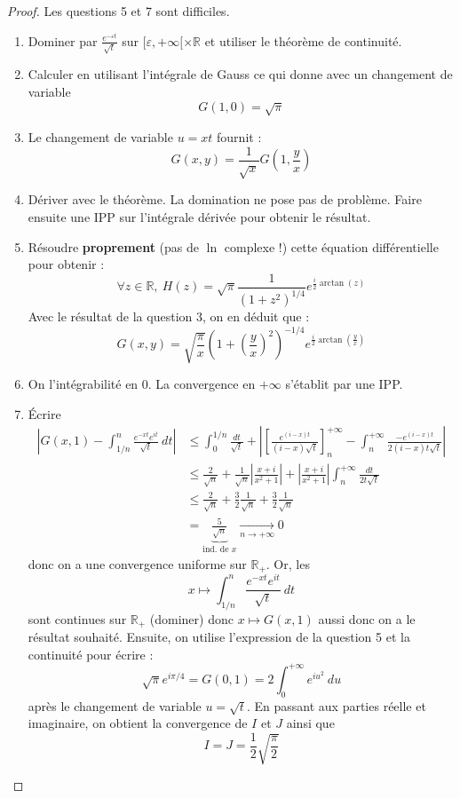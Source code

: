 \documentclass[french,a4paper]{article}
\newcommand{\R}{\mathbb{R}}
\theoremstyle{plain}
\theoremstyle{definition}
\theoremstyle{remark}
\begin{document}
\begin{proof}
	Les questions 5 et 7 sont difficiles.
	\begin{enumerate}
		\item  Dominer par $\displaystyle\frac{e^{-\varepsilon t}}{\sqrt{t}}$ sur $[\varepsilon,+\infty[\times\R$ et utiliser le théorème de continuité.
		\item Calculer en utilisant l'intégrale de Gauss ce qui donne avec un changement de variable $$G(1,0)=\sqrt{\pi}$$
		\item Le changement de variable $u=xt$ fournit : $$G(x,y)=\frac{1}{\sqrt{x}}G\left(1,\frac{y}{x}\right)$$
		\item Dériver avec le théorème. La domination ne pose pas de problème. Faire ensuite une IPP sur l'intégrale dérivée pour obtenir le résultat.
		\item Résoudre \textbf{proprement} (pas de $\ln$ complexe !) cette équation différentielle pour obtenir : $$\forall z\in\R,\ H(z)=\sqrt{\pi}\frac{1}{\left(1+z^2\right)^{1/4}}e^{\frac{i}{2}\arctan(z)}$$
		Avec le résultat de la question 3, on en déduit que : $$G(x,y)=\sqrt{\frac{\pi}{x}}{\left(1+\left(\frac{y}{x}\right)^2\right)^{-1/4}}e^{\frac{i}{2}\arctan\left(\frac{y}{x}\right)}$$
		\item On l'intégrabilité en $0$. La convergence en $+\infty$ s'établit par une IPP.
		\item Écrire
		\begin{align*}
			\left\lvert G(x,1)-\int_{1/n}^{n}\frac{e^{-xt}e^{it}}{\sqrt{t}}\ dt\right\rvert&\leqslant\int_{0}^{1/n}\frac{dt}{\sqrt{t}}+\left\lvert\left[\frac{e^{(i-x)t}}{(i-x)\sqrt{t}}\right]_n^{+\infty} -\int_{n}^{+\infty}\frac{-e^{(i-x)t}}{2(i-x)t\sqrt{t}}\right\rvert \\
			&\leqslant \frac{2}{\sqrt{n}}+\frac{1}{\sqrt{n}}\left\lvert\frac{x+i}{x^2+1}\right\rvert+\left\lvert\frac{x+i}{x^2+1}\right\rvert\int_{n}^{+\infty}\frac{dt}{2t\sqrt{t}}\\
			&\leqslant\frac{2}{\sqrt{n}}+\frac32\frac{1}{\sqrt{n}}+\frac32\frac{1}{\sqrt{n}}\\
			&=\underbrace{\frac{5}{\sqrt{n}}}_{\text{ind. de }x}\xrightarrow[n\to+\infty]{}0
		\end{align*} donc on a une convergence uniforme sur $\R_+$. Or, les $$x\mapsto \int_{1/n}^{n}\frac{e^{-xt}e^{it}}{\sqrt{t}}\ dt$$ sont continues sur $\R_+$ (dominer) donc $x\mapsto G(x,1)$ aussi donc on a le résultat souhaité. Ensuite, on utilise l'expression de la question 5 et la continuité pour écrire : $$\sqrt{\pi}e^{i\pi/4}=G(0,1)=2\int_{0}^{+\infty}e^{iu^2}\ du$$ après le changement de variable $u=\sqrt{t}$. En passant aux parties réelle et imaginaire, on obtient la convergence de $I$ et $J$ ainsi que $$I=J=\frac{1}{2}\sqrt{\frac{\pi}{2}}$$
	\end{enumerate}
\end{proof}
\end{document}
